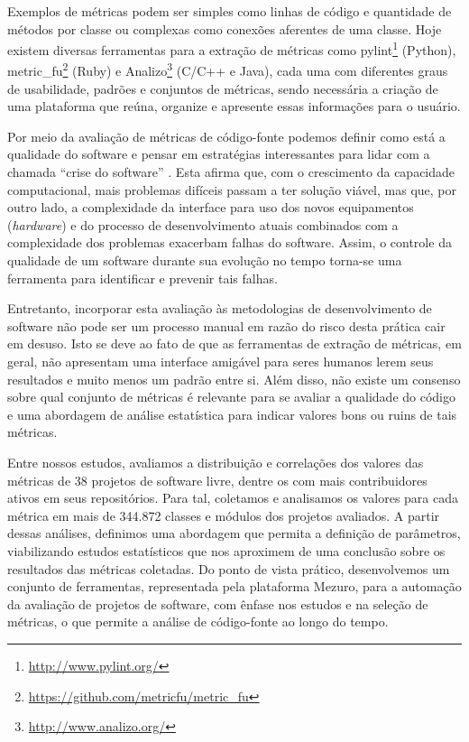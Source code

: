 \documentclass{llncs}
\begin{document}
Exemplos de métricas podem ser simples como linhas de código e quantidade de
métodos por classe ou complexas como conexões aferentes de uma classe. Hoje
existem diversas ferramentas para a extração de métricas como
pylint\footnote{\url{http://www.pylint.org/}} (Python),
metric\_fu\footnote{\url{https://github.com/metricfu/metric_fu}} (Ruby) e
Analizo\footnote{\url{http://www.analizo.org/}} (C/C++ e Java), cada uma com
diferentes graus de usabilidade, padrões e conjuntos de métricas, sendo
necessária a criação de uma plataforma que reúna, organize e apresente essas
informações para o usuário.

Por meio da avaliação de métricas de código-fonte podemos definir como está a
qualidade do software e pensar em estratégias interessantes para lidar
com a chamada ``crise do software'' \cite{naur1969software}. Esta
afirma que, com o crescimento da capacidade computacional, mais problemas
difíceis passam a ter solução viável, mas que, por outro lado, a complexidade
da interface para uso dos novos equipamentos (\textit{hardware}) e do processo
de desenvolvimento atuais combinados com a complexidade dos problemas exacerbam
falhas do software. Assim, o controle da qualidade de um
software durante sua evolução no tempo torna-se uma ferramenta para
identificar e prevenir tais falhas.

Entretanto, incorporar esta avaliação às metodologias de desenvolvimento de
software não pode ser um processo manual em razão do risco desta
prática cair em desuso. Isto se deve ao fato de que as ferramentas de extração
de métricas, em geral, não apresentam uma interface amigável para seres humanos
lerem seus resultados e muito menos um padrão entre si. 
%
Além disso, não existe um consenso sobre qual conjunto de métricas é relevante
para se avaliar a qualidade do código e uma abordagem de análise estatística
para indicar valores bons ou ruins de tais
métricas\cite{meirelles2013monitoramento}.

Entre nossos estudos, avaliamos a distribuição e correlações dos valores das
métricas de 38 projetos de software livre, dentre os com mais contribuidores
ativos em seus repositórios. Para tal, coletamos e analisamos os valores para
cada métrica em mais de 344.872 classes e módulos dos projetos
avaliados\cite{meirelles2013monitoramento}.
%
A partir dessas análises, definimos uma abordagem que permita a definição de
parâmetros, viabilizando estudos estatísticos que nos aproximem de uma
conclusão sobre os resultados das métricas coletadas.
%
Do ponto de vista prático, desenvolvemos um conjunto de ferramentas,
representada pela plataforma Mezuro, para a automação da avaliação de projetos
de software, com ênfase nos estudos e na seleção de métricas, o que
permite a análise de código-fonte ao longo do tempo.
\end{document}
